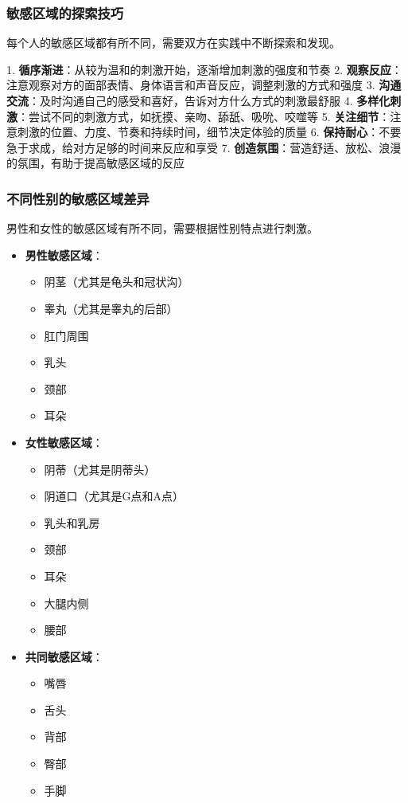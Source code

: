 \documentclass[12pt,UTF8]{ctexbook}
\begin{document}
\subsubsection{敏感区域的探索技巧}

每个人的敏感区域都有所不同，需要双方在实践中不断探索和发现。

1. \textbf{循序渐进}：从较为温和的刺激开始，逐渐增加刺激的强度和节奏
2. \textbf{观察反应}：注意观察对方的面部表情、身体语言和声音反应，调整刺激的方式和强度
3. \textbf{沟通交流}：及时沟通自己的感受和喜好，告诉对方什么方式的刺激最舒服
4. \textbf{多样化刺激}：尝试不同的刺激方式，如抚摸、亲吻、舔舐、吸吮、咬噬等
5. \textbf{关注细节}：注意刺激的位置、力度、节奏和持续时间，细节决定体验的质量
6. \textbf{保持耐心}：不要急于求成，给对方足够的时间来反应和享受
7. \textbf{创造氛围}：营造舒适、放松、浪漫的氛围，有助于提高敏感区域的反应

\subsubsection{不同性别的敏感区域差异}

男性和女性的敏感区域有所不同，需要根据性别特点进行刺激。

\begin{itemize}
\item \textbf{男性敏感区域}：
  \begin{itemize}
  \item 阴茎（尤其是龟头和冠状沟）
  \item 睾丸（尤其是睾丸的后部）
  \item 肛门周围
  \item 乳头
  \item 颈部
  \item 耳朵
  \end{itemize}
\item \textbf{女性敏感区域}：
  \begin{itemize}
  \item 阴蒂（尤其是阴蒂头）
  \item 阴道口（尤其是G点和A点）
  \item 乳头和乳房
  \item 颈部
  \item 耳朵
  \item 大腿内侧
  \item 腰部
  \end{itemize}
\item \textbf{共同敏感区域}：
  \begin{itemize}
  \item 嘴唇
  \item 舌头
  \item 背部
  \item 臀部
  \item 手脚
  \end{itemize}
\end{itemize}
\end{document}
